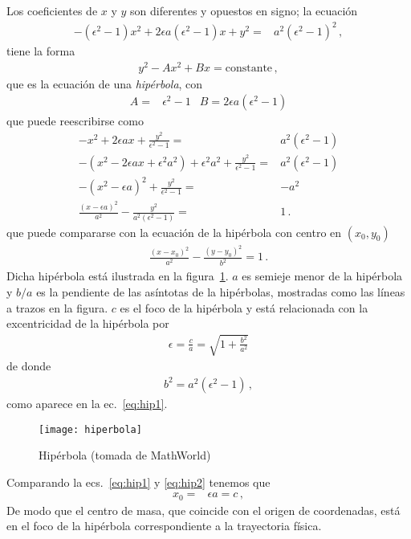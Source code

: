 Los coeficientes de $x$ y $y$ son diferentes y opuestos en signo; la ecuación
  \begin{align}
    -(\epsilon^2-1)x^2+2\epsilon a(\epsilon^2-1)x+y^2=&a^2(\epsilon^2-1)^2\,,
  \end{align}
tiene la forma
  \begin{align}
    y^2-A x^2+Bx=\text{constante}\,,
  \end{align}
que es la ecuación de una \emph{hipérbola}, con
\begin{align}
  A=&\epsilon^2-1& B=2\epsilon a(\epsilon^2-1)
\end{align}
que puede reescribirse como
\begin{align}
  \label{eq:hip1}
-x^2+2\epsilon ax + \frac{y^2}{\epsilon^2-1}=&a^2(\epsilon^2-1)\nonumber\\
-(x^2-2\epsilon ax+\epsilon^2a^2)+\epsilon^2a^2 + \frac{y^2}{\epsilon^2-1}=&a^2(\epsilon^2-1)\nonumber\\
-(x^2-\epsilon a)^2+ \frac{y^2}{\epsilon^2-1}=&-a^2\nonumber\\
\frac{(x-\epsilon a)^2}{a^2}-\frac{y^2}{a^2(\epsilon^2-1)}=&1\,.
\end{align}
que puede compararse con la ecuación de la hipérbola con centro en $(x_0,y_0)$
\begin{align}
  \label{eq:hip2}
\frac{(x-x_0)^2}{a^2}-\frac{(y-y_0)^2}{b^2}=1\,.
\end{align}
Dicha hipérbola está ilustrada en la figura~\ref{fig:hiperbola}. $a$ es semieje menor de la hipérbola y $b/a$ es la pendiente de las asíntotas de la hipérbolas, mostradas como las líneas a trazos en la figura. $c$ es el foco de la hipérbola y está relacionada con la excentricidad de la hipérbola por %
\begin{align}
  \epsilon=\frac{c}{a}=\sqrt{1+\frac{b^2}{a^2}}
\end{align}
de donde
\begin{align}
  b^2=a^2(\epsilon^2-1)\,,
\end{align}
como aparece en la ec.~\eqref{eq:hip1}.
\begin{frame}
\begin{figure}
  \centering
  \texttt{[image: hiperbola]}
  \caption{Hipérbola (tomada de MathWorld)}
  \label{fig:hiperbola}
\end{figure}
\end{frame}
Comparando la ecs.~\eqref{eq:hip1} y \eqref{eq:hip2} tenemos que 
\begin{align}
  x_0=&\epsilon a=c\,,
\end{align}
De modo que el centro de masa, que coincide con el origen de coordenadas, está en el foco de la hipérbola correspondiente a la trayectoria física.

